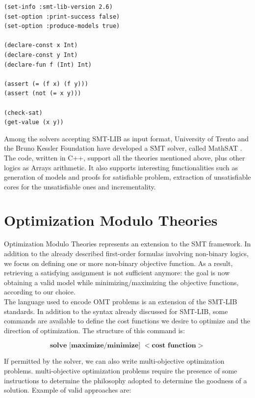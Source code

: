 \begin{lstlisting}[style=interfaces,caption=An example of SMT-LIB encoding.]
(set-info :smt-lib-version 2.6)
(set-option :print-success false)
(set-option :produce-models true)

(declare-const x Int)
(declare-const y Int)
(declare-fun f (Int) Int)

(assert (= (f x) (f y)))
(assert (not (= x y)))

(check-sat)
(get-value (x y))
\end{lstlisting}
Among the solvers accepting SMT-LIB as input format, University of Trento and the Bruno Kessler Foundation have developed a SMT solver, called MathSAT \cite{pa16}. The code, written in C++, support all the theories mentioned above, plus other logics as Arrays arithmetic. It also supports interesting functionalities such as generation of models and proofs for satisfiable problem, extraction of unsatisfiable cores for the unsatisfiable ones and incrementality.

\section{Optimization Modulo Theories}

Optimization Modulo Theories represents an extension to the SMT framework. In addition to the already described first-order formulas involving non-binary logics, we focus on defining one or more non-binary objective function. As a result, retrieving a satisfying assignment is not sufficient anymore: the goal is now obtaining a valid model while minimizing/maximizing the objective functions, according to our choice.\\
The language used to encode OMT problems is an extension of the SMT-LIB standards. In addition to the syntax already discussed for SMT-LIB, some commands are available to define the cost functions we desire to optimize and the direction of optimization. The structure of this command is:

\begin{equation*}
    \textbf{solve [maximize/minimize] $<$cost function$>$}
\end{equation*}

If permitted by the solver, we can also write multi-objective optimization problems. multi-objective optimization problems  require the presence of some instructions to determine the philosophy adopted to determine the goodness of a solution. Example of valid approaches are:

